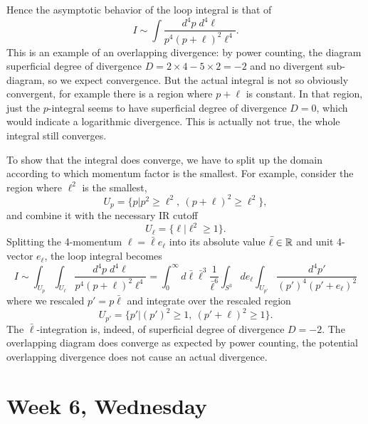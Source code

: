 \documentclass[12pt]{article}
\begin{document}
Hence the asymptotic behavior of the loop integral is that of 
\begin{equation}
  I \sim
  \int \frac{d^4p \; d^4\ell}{p^4 (p+\ell)^2 \ell^4}.
\end{equation}
This is an example of an overlapping divergence: by power counting,
the diagram superficial degree of divergence $D=2\times 4-5\times 2
=-2$ and no divergent sub-diagram, so we expect convergence. But the
actual integral is not so obviously convergent, for example there is a
region where $p+\ell$ is constant. In that region, just the
$p$-integral seems to have superficial degree of divergence $D=0$,
which would indicate a logarithmic divergence. This is actually not
true, the whole integral still converges.

To show that the integral does converge, we have to split up the
domain according to which momentum factor is the smallest. For
example, consider the region where $\ell^2$ is the smallest,
\begin{equation}
  U_p = \big\{
  p \big|
  p^2 \geq \ell^2,~ (p+\ell)^2 \geq \ell^2  \big\},
\end{equation}
and combine it with the necessary IR cutoff
\begin{equation}
  U_\ell = \big\{
  \ell \big| \ell^2 \geq 1 \big\}.
\end{equation}
Splitting the 4-momentum $\ell = \bar\ell e_\ell$ into its absolute
value $\bar\ell\in{\mathbb{R}}$ and unit 4-vector $e_\ell$, the loop integral
becomes
\begin{equation}
  I \sim
  \int_{U_p} \int_{U_\ell}
  \frac{d^4p \; d^4\ell}{p^4 (p+\ell)^2 \ell^4}
  = 
  \int_0^\infty d\bar\ell
  \bar\ell^3
  \frac{1}{\bar\ell^6}
  \int_{S^3} de_\ell 
  \int_{U_{p'}}
  \frac{d^4 p'}{(p')^4 (p'+e_\ell)^2}
\end{equation}
where we rescaled $p' = p \bar\ell$ and integrate over the  rescaled
region
\begin{equation}
  U_{p'} = \big\{
  p' \big|
  (p')^2 \geq 1,~ (p'+\ell)^2 \geq 1  \big\}.
\end{equation}
The $\bar\ell$-integration is, indeed, of superficial degree of
divergence $D=-2$. The overlapping diagram does converge as expected
by power counting, the potential overlapping divergence does not cause
an actual divergence.



\section{Week 6, Wednesday}
\end{document}
